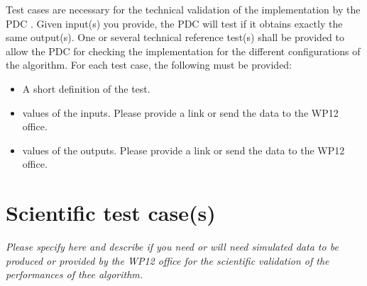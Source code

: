 \documentclass[a4paper, oneside, 11pt, article, english]{memoir}
\begin{document}
{
  \itshape

  Test cases are necessary for the technical validation of the implementation
  by the PDC . Given input(s) you provide, the PDC will test if it obtains
  exactly the same output(s). One or several technical reference test(s) shall
  be provided to allow the PDC for checking the implementation for the different
  configurations of the algorithm. For each test case, the following must be
  provided:

  \begin{itemize}
    \firmlist
  \item A short definition of the test.
  \item values of the inputs. Please provide a link or send the data to the WP12 office.
  \item values of the outputs. Please provide a link or send the data to the WP12 office.
  \end{itemize}
}


\section{Scientific test case(s)}
\label{sec:test-science}

\emph{Please specify here and describe if you need or will need simulated data
  to be produced or provided by the WP12 office for the scientific validation of
  the performances of thee algorithm.}
\end{document}
